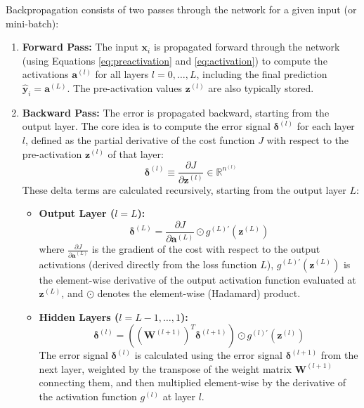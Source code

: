 \documentclass[11pt,twoside,openright]{report}
\begin{document}
Backpropagation consists of two passes through the network for a given input (or mini-batch):

\begin{enumerate}
    \item \textbf{Forward Pass:} The input $\mathbf{x}_i$ is propagated forward through the network (using Equations \ref{eq:preactivation} and \ref{eq:activation}) to compute the activations $\mathbf{a}^{(l)}$ for all layers $l=0, \dots, L$, including the final prediction $\hat{\mathbf{y}}_i = \mathbf{a}^{(L)}$. The pre-activation values $\mathbf{z}^{(l)}$ are also typically stored.
    \item \textbf{Backward Pass:} The error is propagated backward, starting from the output layer. The core idea is to compute the error signal $\bm{\delta}^{(l)}$ for each layer $l$, defined as the partial derivative of the cost function $J$ with respect to the pre-activation $\mathbf{z}^{(l)}$ of that layer:
        \begin{equation} \label{eq:delta_def}
            \bm{\delta}^{(l)} \equiv \frac{\partial J}{\partial \mathbf{z}^{(l)}} \in \mathbb{R}^{n^{(l)}}
        \end{equation}
        These delta terms are calculated recursively, starting from the output layer $L$:
        \begin{itemize}
            \item \textbf{Output Layer ($l=L$):}
                \begin{equation} \label{eq:delta_L}
                    \bm{\delta}^{(L)} = \frac{\partial J}{\partial \mathbf{a}^{(L)}} \odot g^{(L)'}(\mathbf{z}^{(L)})
                \end{equation}
                where $\frac{\partial J}{\partial \mathbf{a}^{(L)}}$ is the gradient of the cost with respect to the output activations (derived directly from the loss function $L$), $g^{(L)'}(\mathbf{z}^{(L)})$ is the element-wise derivative of the output activation function evaluated at $\mathbf{z}^{(L)}$, and $\odot$ denotes the element-wise (Hadamard) product.
            \item \textbf{Hidden Layers ($l = L-1, \dots, 1$):}
                \begin{equation} \label{eq:delta_l}
                    \bm{\delta}^{(l)} = \left( (\mathbf{W}^{(l+1)})^T \bm{\delta}^{(l+1)} \right) \odot g^{(l)'}(\mathbf{z}^{(l)})
                \end{equation}
                The error signal $\bm{\delta}^{(l)}$ is calculated using the error signal $\bm{\delta}^{(l+1)}$ from the next layer, weighted by the transpose of the weight matrix $\mathbf{W}^{(l+1)}$ connecting them, and then multiplied element-wise by the derivative of the activation function $g^{(l)}$ at layer $l$.
        \end{itemize}
\end{enumerate}
\end{document}
